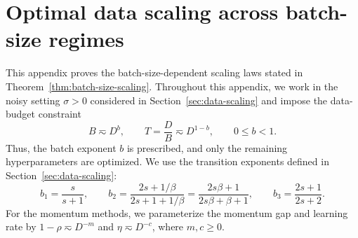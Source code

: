 \documentclass[11pt]{article}
\newcommand{\nesterov}{\mathrm{nesterov}}
\begin{document}




\section{Optimal data scaling across batch-size regimes}
\label{app:sec:data-scaling}
This appendix proves the batch-size-dependent scaling laws stated in Theorem~\ref{thm:batch-size-scaling}. Throughout this appendix, we work in the noisy setting $\sigma>0$ considered in Section~\ref{sec:data-scaling} and impose the data-budget constraint
\[
B\eqsim D^b,\qquad T=\frac{D}{B}\eqsim D^{1-b},\qquad 0\le b<1.
\]
Thus, the batch exponent $b$ is prescribed, and only the remaining hyperparameters are optimized. We use the transition exponents defined in Section~\ref{sec:data-scaling}:
\[
b_1=\frac{s}{s+1},\qquad b_2=\frac{2s+1/\beta}{2s+1+1/\beta}=\frac{2s\beta+1}{2s\beta+\beta+1},\qquad b_3=\frac{2s+1}{2s+2}.
\]
For the momentum methods, we parameterize the momentum gap and learning rate by $1-\rho\eqsim D^{-m}$ and $\eta\eqsim D^{-c}$, where $m,c\ge0$.
\end{document}
